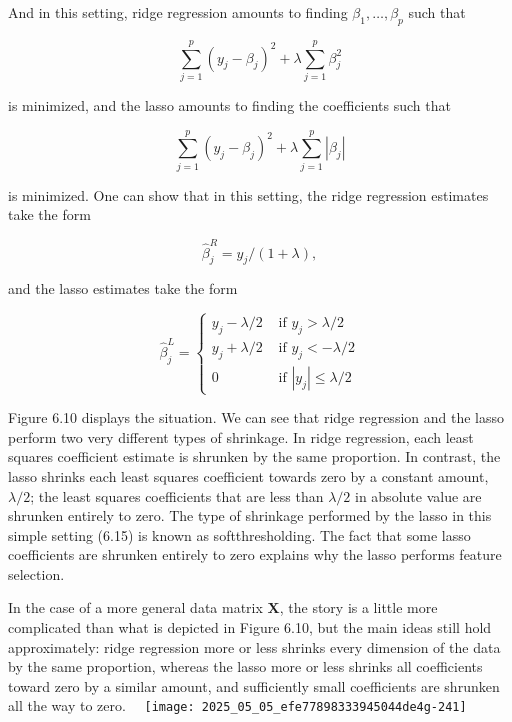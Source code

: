 \documentclass[10pt]{article}
\begin{document}
And in this setting, ridge regression amounts to finding $\beta_{1}, \ldots, \beta_{p}$ such that


\begin{equation*}
\sum_{j=1}^{p}\left(y_{j}-\beta_{j}\right)^{2}+\lambda \sum_{j=1}^{p} \beta_{j}^{2} \tag{6.12}
\end{equation*}


is minimized, and the lasso amounts to finding the coefficients such that


\begin{equation*}
\sum_{j=1}^{p}\left(y_{j}-\beta_{j}\right)^{2}+\lambda \sum_{j=1}^{p}\left|\beta_{j}\right| \tag{6.13}
\end{equation*}


is minimized. One can show that in this setting, the ridge regression estimates take the form


\begin{equation*}
\hat{\beta}_{j}^{R}=y_{j} /(1+\lambda), \tag{6.14}
\end{equation*}


and the lasso estimates take the form

\[
\hat{\beta}_{j}^{L}= \begin{cases}y_{j}-\lambda / 2 & \text { if } y_{j}>\lambda / 2  \tag{6.15}\\ y_{j}+\lambda / 2 & \text { if } y_{j}<-\lambda / 2 \\ 0 & \text { if }\left|y_{j}\right| \leq \lambda / 2\end{cases}
\]

Figure 6.10 displays the situation. We can see that ridge regression and the lasso perform two very different types of shrinkage. In ridge regression, each least squares coefficient estimate is shrunken by the same proportion. In contrast, the lasso shrinks each least squares coefficient towards zero by a constant amount, $\lambda / 2$; the least squares coefficients that are less than $\lambda / 2$ in absolute value are shrunken entirely to zero. The type of shrinkage performed by the lasso in this simple setting (6.15) is known as softthresholding. The fact that some lasso coefficients are shrunken entirely to zero explains why the lasso performs feature selection.

In the case of a more general data matrix $\mathbf{X}$, the story is a little more complicated than what is depicted in Figure 6.10, but the main ideas still hold approximately: ridge regression more or less shrinks every dimension of the data by the same proportion, whereas the lasso more or less shrinks all coefficients toward zero by a similar amount, and sufficiently small coefficients are shrunken all the way to zero.\
\
\texttt{[image: 2025\_05\_05\_efe77898333945044de4g-241]}
\end{document}
